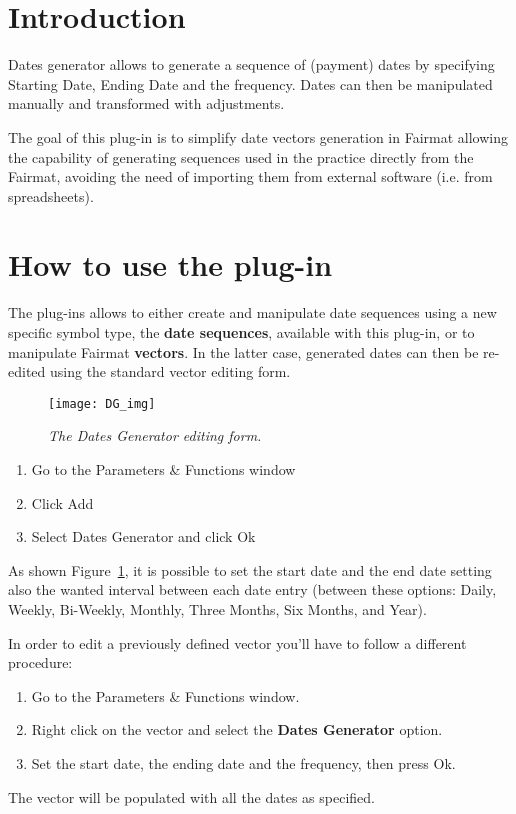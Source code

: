 \newcommand{\pluginName}{Dates Generator}
\newcommand{\pluginVersion}{1.0}





\PluginTitle{\pluginName}{\pluginVersion}

\section{Introduction}
Dates generator allows to generate a sequence of (payment) dates by specifying Starting Date, Ending Date and the frequency. Dates can then be manipulated manually and transformed with adjustments.

The goal of this plug-in is to simplify date vectors generation in Fairmat allowing the capability of generating sequences used in the practice directly from the Fairmat, avoiding the 
need of importing them from external software (i.e. from spreadsheets).

\section{How to use the plug-in}
The plug-ins allows to either create and manipulate date sequences using a new specific symbol type, the \textbf{date sequences}, available with this plug-in, or to manipulate Fairmat \textbf{vectors}. In the latter case, generated dates can then be re-edited using the standard vector editing form.

\begin{figure}[htbp]
\texttt{[image: DG\_img]}
\centering
\caption{\small{\emph{The Dates Generator editing form.}}}
\label{fig:DG}
\end{figure}

\begin{enumerate}
\item Go to the Parameters \& Functions window
\item Click Add
\item Select Dates Generator and click Ok
\end{enumerate}
As shown Figure~\ref{fig:DG}, it is possible to set the start date and the end date setting also the wanted interval between each date entry (between these options: Daily, Weekly, Bi-Weekly, Monthly, Three Months, Six Months, and Year).




In order to edit a previously defined  vector  you'll have to follow a different procedure:
\begin{enumerate}
\item Go to the Parameters \& Functions window.
\item Right click on the vector and select the \textbf{Dates Generator} option.
\item Set the start date, the ending date and the frequency, then press Ok.
\end{enumerate}
The vector will be populated with all the dates as specified.

